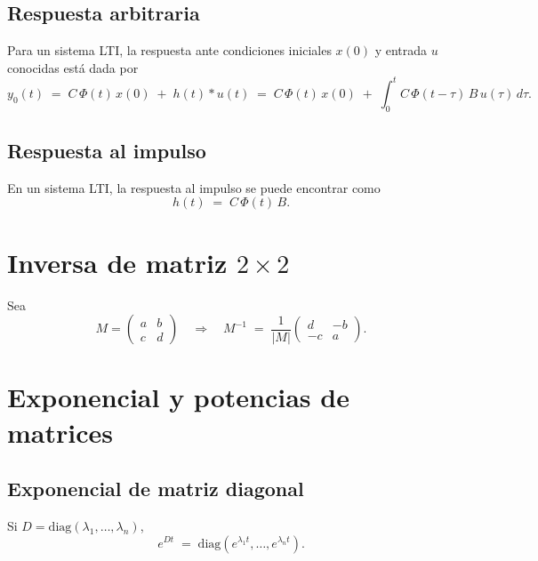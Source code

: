 \documentclass[
  11pt,
  letterpaper,
   addpoints,
  answers
  ]{exam}
\begin{document}
\subsection*{Respuesta arbitraria}
Para un sistema LTI, la respuesta ante condiciones iniciales $x(0)$ y entrada $u$ conocidas está dada por
\begin{equation}
  y_0(t) \;=\; C\,\Phi(t)\,x(0)\;+\; h(t)\ast u(t)\;=\; C\,\Phi(t)\,x(0)\;+\; \int_{0}^{t} C\,\Phi(t-\tau)\,B\,u(\tau)\,d\tau.
\end{equation}

\subsection*{Respuesta al impulso}
En un sistema LTI, la respuesta al impulso se puede encontrar como
\begin{equation}
  h(t) \;=\; C\,\Phi(t)\,B.
\end{equation}

\section*{Inversa de matriz $2\times 2$}

Sea
\begin{equation}
  M=\begin{pmatrix} a & b \\ c & d \end{pmatrix}
  \quad\Rightarrow\quad
  M^{-1} \;=\; \frac{1}{|M|}\begin{pmatrix} d & -b \\ -c & a \end{pmatrix}.
\end{equation}

\section*{Exponencial y potencias de matrices}

\subsection*{Exponencial de matriz diagonal}
Si $D=\mathrm{diag}(\lambda_1,\dots,\lambda_n)$,
\begin{equation}
  e^{Dt} \;=\; \mathrm{diag}\left(e^{\lambda_1 t},\dots,e^{\lambda_n t}\right).
\end{equation}
\end{document}
